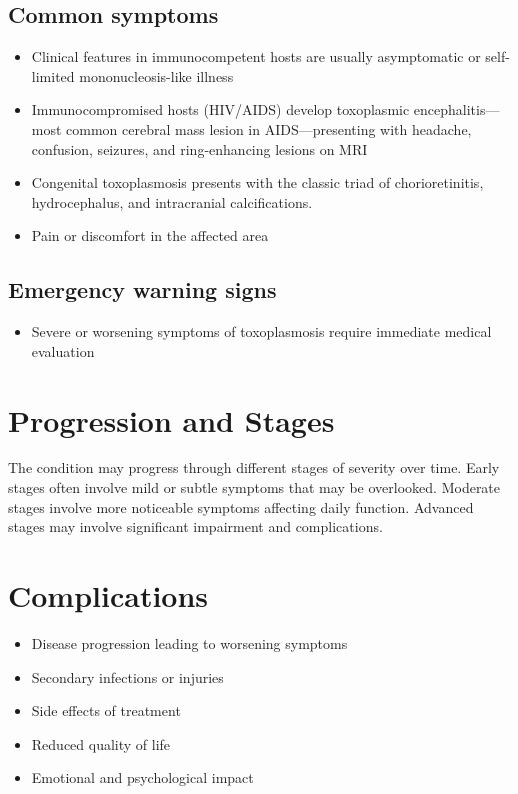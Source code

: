 \subsection{Common symptoms}
\begin{itemize}[noitemsep]
  \item Clinical features in immunocompetent hosts are usually asymptomatic or self-limited mononucleosis-like illness
  \item Immunocompromised hosts (HIV/AIDS) develop toxoplasmic encephalitis---most common cerebral mass lesion in AIDS---presenting with headache, confusion, seizures, and ring-enhancing lesions on MRI
  \item Congenital toxoplasmosis presents with the classic triad of chorioretinitis, hydrocephalus, and intracranial calcifications.
  \item Pain or discomfort in the affected area
  \end{itemize}

\subsection{Emergency warning signs}
\begin{itemize}[noitemsep]
  \item Severe or worsening symptoms of toxoplasmosis require immediate medical evaluation
\end{itemize}
\section{Progression and Stages}
The condition may progress through different stages of severity over time. Early stages often involve mild or subtle symptoms that may be overlooked. Moderate stages involve more noticeable symptoms affecting daily function. Advanced stages may involve significant impairment and complications.
\section{Complications}
\begin{itemize}[noitemsep]
  \item Disease progression leading to worsening symptoms
  \item Secondary infections or injuries
  \item Side effects of treatment
  \item Reduced quality of life
  \item Emotional and psychological impact
\end{itemize}
